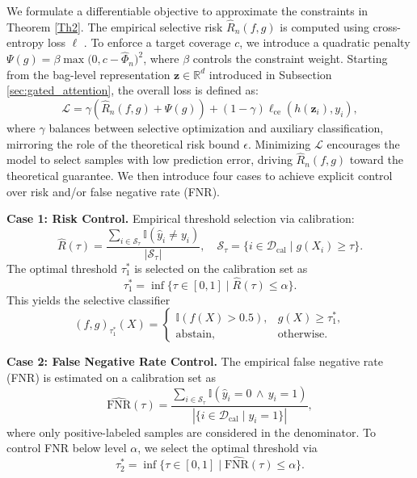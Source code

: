 \documentclass[journal,twoside,web]{ieeecolor}
\begin{document}
We formulate a differentiable objective to approximate the constraints in Theorem \ref{Th2}. The empirical selective risk $\hat{R}_n(f,g)$ is computed using cross-entropy loss $\ell$ \cite{geifman2019selectivenet}. To enforce a target coverage $c$, we introduce a quadratic penalty $\Psi(g) = \beta \max\big(0, c - \hat{\Phi}_n \big)^2$, where $\beta$ controls the constraint weight. Starting from the bag-level representation $\mathbf{z} \in \mathbb{R}^d$ introduced in Subsection \ref{sec:gated_attention}, the overall loss is defined as:
\begin{equation*}
    \mathcal{L} = \gamma \left(\hat{R}_n(f,g) + \Psi(g)\right) + (1-\gamma) \ell_{\mathrm{ce}}(h(\mathbf{z}_i), y_i),
\end{equation*}
where $\gamma$ balances between selective optimization and auxiliary classification, mirroring the role of the theoretical risk bound $\epsilon$. Minimizing $\mathcal{L}$ encourages the model to select samples with low prediction error, driving $\hat{R}_n(f,g)$ toward the theoretical guarantee. We then introduce four cases to achieve explicit control over risk and/or false negative rate (FNR).

\textbf{Case 1: Risk Control.}
Empirical threshold selection via calibration:
\[
\hat{R}(\tau)=\frac{\sum_{i\in\mathcal{S}_\tau}\mathbb{I}(\hat{y}_i \neq y_i)}{|\mathcal{S}_\tau|},
\quad
\mathcal{S}_\tau=\{i\in\mathcal{D}_{\mathrm{cal}}\mid g(X_i)\geq \tau\}.
\]
The optimal threshold $\tau_{1}^*$ is selected on the calibration set as
\begin{equation}\label{Eq1}
    \tau_{1}^*=\inf\{\tau \in[0,1]\mid\hat{R}(\tau)\leq\alpha\}.
\end{equation}
This yields the selective classifier
\[
(f,g)_{\tau_{1}^*}(X)=
\begin{cases}
\mathbb{I}\!\left(f(X)>0.5\right), & g(X)\geq \tau_{1}^*,\\[4pt]
\text{abstain}, & \text{otherwise}.
\end{cases}
\]

\textbf{Case 2: False Negative Rate Control.}
The empirical false negative rate (FNR) is estimated on a calibration set as
\[
\widehat{\mathrm{FNR}}(\tau)=\frac{\sum_{i \in\mathcal{S}_\tau}\mathbb{I}(\hat{y}_i=0\,\wedge\, y_i=1)}{|\{i\in\mathcal{D}_{\mathrm{cal}}\mid y_i=1\}|},
\]
where only positive-labeled samples are considered in the denominator. To control FNR below level $\alpha$, we select the optimal threshold via 
\begin{equation}\label{Eq2}
  \tau_{2}^*=\inf\{\tau\in[0,1]\mid \widehat{\mathrm{FNR}}(\tau)\leq\alpha\}.  
\end{equation}
\end{document}
